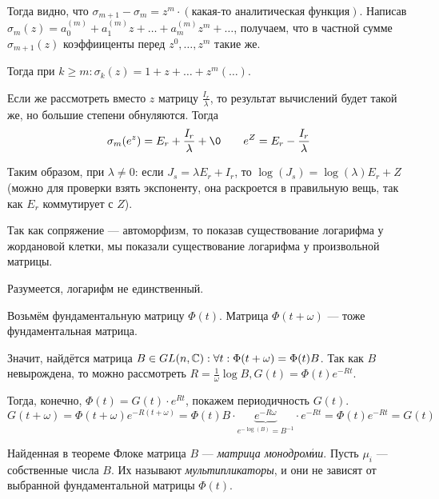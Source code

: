 \documentclass[a4paper]{report}
\begin{document}
{{{{{Тогда видно, что $\sigma_{m + 1} - \sigma_m = z^m\cdot (\text{какая-то аналитическая функция})$.
Написав $\sigma_m(z) = a_0^{(m)} + a_1^{(m)}z + \dots + a_m^{(m)}z^m + \dots$, получаем, что в частной сумме $\sigma_{m + 1}(z)$ коэффииценты перед $z^0, \dots, z^m$ такие же.

Тогда при $k \ge m: \sigma_k(z) = 1 + z + \dots + z^m(\dots)$.

    Если же рассмотреть вместо $z$ матрицу $\frac{I_r}{\lambda}$, то результат вычислений будет такой же, но большие степени обнуляются.
        Тогда \[\sigma_m(e^z) = E_r + \frac{I_r}{\lambda} + \0\qquad e^Z = E_r - \frac{I_r}{\lambda}\]
    }

Таким образом, при $\lambda \ne 0$: если $J_s = \lambda E_r + I_r$, то $\log(J_s) = \log(\lambda) E_r + Z$ (можно для проверки взять экспоненту, она раскроется в правильную вещь, так как $E_r$ коммутирует с $Z$).

    Так как сопряжение --- автоморфизм, то показав существование логарифма у жордановой клетки, мы показали существование логарифма у произвольной матрицы.

Разумеется, логарифм не единственный.
}
}
    Возьмём фундаментальную матрицу $\Phi(t)$.
        Матрица $\Phi(t + \omega)$ --- тоже фундаментальная матрица.

    Значит, найдётся матрица $B \in GL(n, \mathbb{C}): \forall t: \Phi(t + \omega) = \Phi(t)B$.
        Так как $B$ невырождена, то можно рассмотреть $R = \frac{1}{\omega}\log B, G(t) = \Phi(t)e^{-Rt}$.

    Тогда, конечно, $\Phi(t) = G(t) \cdot e^{Rt}$, покажем периодичность $G(t)$.
    \[G(t + \omega) = \Phi(t + \omega)e^{-R(t + \omega)} = \Phi(t)B \cdot \underbrace{e^{-R\omega}}_{e^{-\log(B)} = B^{-1}} \cdot e^{-R t} = \Phi(t)e^{-Rt} = G(t)\]
    }
    }
    Найденная в теореме Флоке матрица $B$ --- \emph{матрица монодром$\acute{\text{и}}$и}.
    Пусть $\mu_i$ --- собственные числа $B$.
    Их называют \emph{мультипликаторы}, и они не зависят от выбранной фундаментальной матрицы $\Phi(t)$.
\end{document}
